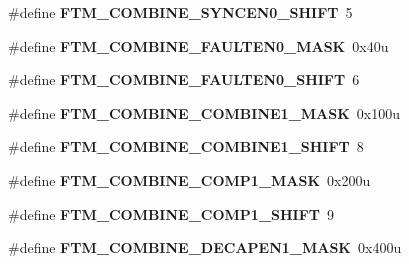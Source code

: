 \begin{DoxyCompactItemize}
\item 
\#define {\bfseries F\+T\+M\+\_\+\+C\+O\+M\+B\+I\+N\+E\+\_\+\+S\+Y\+N\+C\+E\+N0\+\_\+\+S\+H\+I\+FT}~5\hypertarget{group__FTM__Register__Masks_gab9eba65827e4b667e34b89f58640b960}{}\label{group__FTM__Register__Masks_gab9eba65827e4b667e34b89f58640b960}

\item 
\#define {\bfseries F\+T\+M\+\_\+\+C\+O\+M\+B\+I\+N\+E\+\_\+\+F\+A\+U\+L\+T\+E\+N0\+\_\+\+M\+A\+SK}~0x40u\hypertarget{group__FTM__Register__Masks_gad373b84d922eba1365283a7ebb5d87f4}{}\label{group__FTM__Register__Masks_gad373b84d922eba1365283a7ebb5d87f4}

\item 
\#define {\bfseries F\+T\+M\+\_\+\+C\+O\+M\+B\+I\+N\+E\+\_\+\+F\+A\+U\+L\+T\+E\+N0\+\_\+\+S\+H\+I\+FT}~6\hypertarget{group__FTM__Register__Masks_gac0b55b271d7734489d9e53b0d2ad1a64}{}\label{group__FTM__Register__Masks_gac0b55b271d7734489d9e53b0d2ad1a64}

\item 
\#define {\bfseries F\+T\+M\+\_\+\+C\+O\+M\+B\+I\+N\+E\+\_\+\+C\+O\+M\+B\+I\+N\+E1\+\_\+\+M\+A\+SK}~0x100u\hypertarget{group__FTM__Register__Masks_ga5378f59bc8234381865e973deb638b6f}{}\label{group__FTM__Register__Masks_ga5378f59bc8234381865e973deb638b6f}

\item 
\#define {\bfseries F\+T\+M\+\_\+\+C\+O\+M\+B\+I\+N\+E\+\_\+\+C\+O\+M\+B\+I\+N\+E1\+\_\+\+S\+H\+I\+FT}~8\hypertarget{group__FTM__Register__Masks_gaf9a5abb2341af83a58d95ccb704d8a11}{}\label{group__FTM__Register__Masks_gaf9a5abb2341af83a58d95ccb704d8a11}

\item 
\#define {\bfseries F\+T\+M\+\_\+\+C\+O\+M\+B\+I\+N\+E\+\_\+\+C\+O\+M\+P1\+\_\+\+M\+A\+SK}~0x200u\hypertarget{group__FTM__Register__Masks_ga24a8dd787f2e00cde644bf23a4c16123}{}\label{group__FTM__Register__Masks_ga24a8dd787f2e00cde644bf23a4c16123}

\item 
\#define {\bfseries F\+T\+M\+\_\+\+C\+O\+M\+B\+I\+N\+E\+\_\+\+C\+O\+M\+P1\+\_\+\+S\+H\+I\+FT}~9\hypertarget{group__FTM__Register__Masks_ga58bf0f457a2ce6f35ad0f75115bbcc90}{}\label{group__FTM__Register__Masks_ga58bf0f457a2ce6f35ad0f75115bbcc90}

\item 
\#define {\bfseries F\+T\+M\+\_\+\+C\+O\+M\+B\+I\+N\+E\+\_\+\+D\+E\+C\+A\+P\+E\+N1\+\_\+\+M\+A\+SK}~0x400u\hypertarget{group__FTM__Register__Masks_ga75b422313fe76b13eb70022f15120d3f}{}\label{group__FTM__Register__Masks_ga75b422313fe76b13eb70022f15120d3f}


\end{DoxyCompactItemize}

